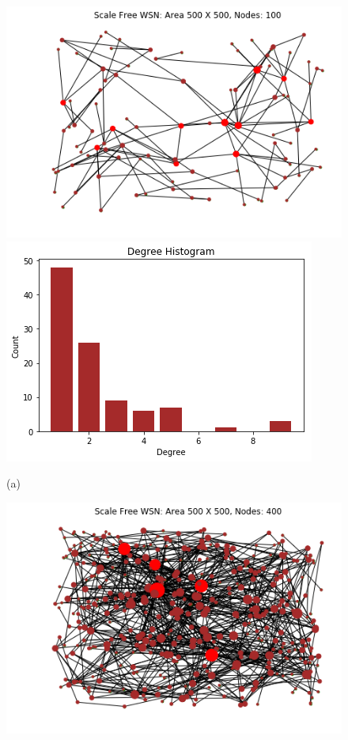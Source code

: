 \documentclass{article}
\begin{document}
\begin{figure}[!htb]
	\includegraphics[width=\linewidth]{Results/100-1.png}
	\includegraphics[width=\linewidth]{Results/100-1(B).png}
	\begin{center}
		(a)
	\end{center}
	\endminipage\hfill
	\includegraphics[width=\linewidth]{Results/400-1.png}

\end{figure}
\end{document}
